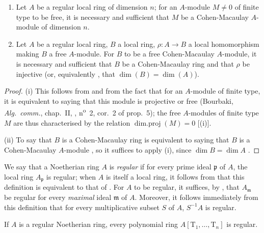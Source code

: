 \begin{corollary}[17.3.5]
\label{0.17.3.5}
\begin{enumerate}
  \item[{\rm(i)}] Let $A$ be a regular local ring of dimension $n$; for an $A$-module $M\neq 0$ of finite type to be free, it is necessary and sufficient that $M$ be a Cohen-Macaulay $A$-module of dimension $n$.
  \item[{\rm(ii)}] Let $A$ be a regular local ring, $B$ a local ring, $\rho:A\to B$ a local homomorphism making $B$ a free $A$-module.
  For $B$ to be a free Cohen-Macaulay $A$-module, it is necessary and sufficient that $B$ be a Cohen-Macaulay ring and that $\rho$ be injective (or, equivalently , that $\dim(B)=\dim(A)$).
\end{enumerate}
\end{corollary}

\begin{proof}
(i) This follows from  and from the fact that for an $A$-module of finite type, it is equivalent to saying that this module is projective or free (Bourbaki, \emph{Alg.~comm.}, chap.~II, , n\textsuperscript{o}~2, cor.~2 of prop.~5);
the free $A$-modules of finite type $M$ are thus characterised by the relation $\operatorname{dim.proj}(M)=0$ [(i)].

(ii) To say that $B$ is a Cohen-Macaulay ring is equivalent to saying that $B$ is a Cohen-Macaulay $A$-module , so it suffices to apply (i), since $\dim B=\dim A$ .
\end{proof}

\begin{env}[17.3.6]
\label{0.17.3.6}
We say that a Noetherian ring $A$ is \emph{regular} if for every prime ideal $\mathfrak{p}$ of $A$, the local ring $A_\mathfrak{p}$ is regular;
when $A$ is itself a local ring, it follows from  that this definition is equivalent to that of .
For $A$ to be regular, it suffices, by , that $A_\mathfrak{m}$ be regular for every \emph{maximal} ideal $\mathfrak{m}$ of $A$.
Moreover, it follows immediately from this definition that for every multiplicative subset $S$ of $A$, $S^{-1}A$ is regular.
\end{env}

\begin{proposition}[17.3.7]
\label{0.17.3.7}
If $A$ is a regular Noetherian ring, every polynomial ring $A[\mathrm{T}_1,\ldots,\mathrm{T}_n]$ is regular.
\end{proposition}

